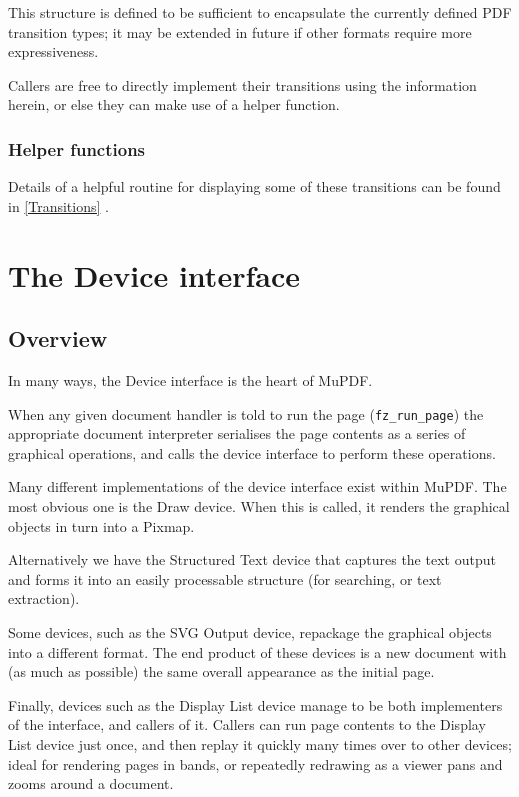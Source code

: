 \documentclass[oneside]{book}
\newcommand{\rjwref}[1] {\autoref{#1} \nameref{#1}}
\begin{document}
This structure is defined to be sufficient to encapsulate the currently defined PDF transition types; it may be extended in future if other formats require more expressiveness.

Callers are free to directly implement their transitions using the information herein, or else they can make use of a helper function.

\subsection{Helper functions}

Details of a helpful routine for displaying some of these transitions can be found in \rjwref{Transitions}.

\chapter{The Device interface}
\label{Device}

\section{Overview}

In many ways, the Device interface is the heart of MuPDF.

When any given document handler is told to run the page (\texttt{fz\_run\_page}) the appropriate document interpreter serialises the page contents as a series of graphical operations, and calls the device interface to perform these operations.

Many different implementations of the device interface exist within MuPDF. The most obvious one is the Draw device. When this is called, it renders the graphical objects in turn into a Pixmap.

Alternatively we have the Structured Text device that captures the text output and forms it into an easily processable structure (for searching, or text extraction).

Some devices, such as the SVG Output device, repackage the graphical objects into a different format. The end product of these devices is a new document with (as much as possible) the same overall appearance as the initial page.

Finally, devices such as the Display List device manage to be both implementers of the interface, and callers of it. Callers can run page contents to the Display List device just once, and then replay it quickly many times over to other devices; ideal for rendering pages in bands, or repeatedly redrawing as a viewer pans and zooms around a document.
\end{document}
